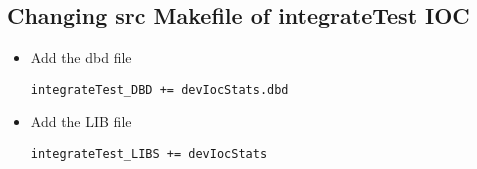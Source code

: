 \documentclass[11pt
  , a4paper
  , article
  , oneside
]{memoir}
\begin{document}
\subsection{Changing src Makefile of integrateTest IOC}
\begin{itemize}
	
	\item Add the dbd file
	\begin{lstlisting}[style=termstyle]
integrateTest_DBD += devIocStats.dbd
\end{lstlisting}
	\item Add the LIB file
	\begin{lstlisting}[style=termstyle]
integrateTest_LIBS += devIocStats
\end{lstlisting}
\end{itemize}
\end{document}
